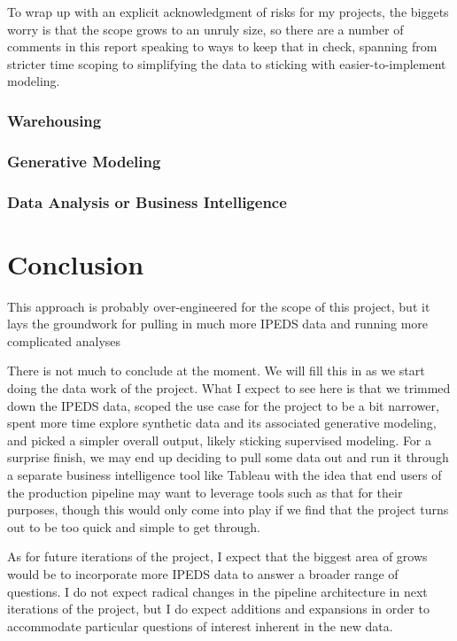 \documentclass[sigconf, authorversion, nonacm]{acmart}
\begin{document}
    To wrap up with an explicit acknowledgment of risks for my projects, the biggets worry is that the scope grows to an unruly size, so there are a number of comments in this report speaking to ways to keep that in check, spanning from stricter time scoping to simplifying the data to sticking with easier-to-implement modeling.

    \subsubsection{Warehousing}
    \subsubsection{Generative Modeling}
    \subsubsection{Data Analysis or Business Intelligence}

\section{Conclusion}


    This approach is probably over-engineered for the scope of this project, but it lays the groundwork for pulling in much more IPEDS data and running more complicated analyses




    There is not much to conclude at the moment. We will fill this in as we start doing the data work of the project. What I expect to see here is that we trimmed down the IPEDS data, scoped the use case for the project to be a bit narrower, spent more time explore synthetic data and its associated generative modeling, and picked a simpler overall output, likely sticking supervised modeling. For a surprise finish, we may end up deciding to pull some data out and run it through a separate business intelligence tool like Tableau with the idea that end users of the production pipeline may want to leverage tools such as that for their purposes, though this would only come into play if we find that the project turns out to be too quick and simple to get through.

    As for future iterations of the project, I expect that the biggest area of grows would be to incorporate more IPEDS data to answer a broader range of questions. I do not expect radical changes in the pipeline architecture in next iterations of the project, but I do expect additions and expansions in order to accommodate particular questions of interest inherent in the new data.
\end{document}
